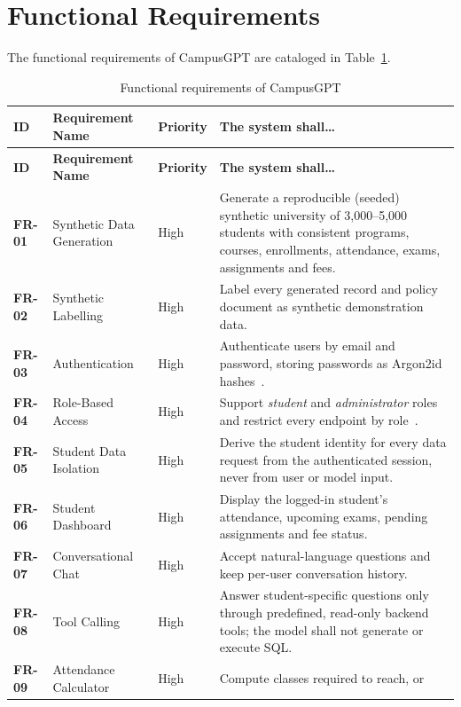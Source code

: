 \documentclass[11pt,a4paper,oneside]{report}
\begin{document}
\section{Functional Requirements}
The functional requirements of CampusGPT are cataloged in Table~\ref{tab:fr}.

\begin{longtable}{@{}>{\raggedright\arraybackslash}p{1.5cm}>{\raggedright\arraybackslash}p{3.4cm}>{\raggedright\arraybackslash}p{1.7cm}>{\raggedright\arraybackslash}p{7.4cm}@{}}
\caption{Functional requirements of CampusGPT}\label{tab:fr}\\
\toprule
\textbf{ID} & \textbf{Requirement Name} & \textbf{Priority} & \textbf{The system shall\ldots}\\
\midrule
\endfirsthead
\toprule
\textbf{ID} & \textbf{Requirement Name} & \textbf{Priority} & \textbf{The system shall\ldots}\\
\midrule
\endhead
\bottomrule
\endfoot
\textbf{FR-01} & Synthetic Data Generation & High & Generate a reproducible (seeded) synthetic
university of 3,000--5,000 students with consistent programs, courses, enrollments,
attendance, exams, assignments and fees.\\
\textbf{FR-02} & Synthetic Labelling & High & Label every generated record and policy
document as synthetic demonstration data.\\
\textbf{FR-03} & Authentication & High & Authenticate users by email and password, storing
passwords as Argon2id hashes~\cite{biryukov2016argon2}.\\
\textbf{FR-04} & Role-Based Access & High & Support \emph{student} and \emph{administrator}
roles and restrict every endpoint by role~\cite{sandhu1996rbac}.\\
\textbf{FR-05} & Student Data Isolation & High & Derive the student identity for every data
request from the authenticated session, never from user or model input.\\
\textbf{FR-06} & Student Dashboard & High & Display the logged-in student's attendance,
upcoming exams, pending assignments and fee status.\\
\textbf{FR-07} & Conversational Chat & High & Accept natural-language questions and keep
per-user conversation history.\\
\textbf{FR-08} & Tool Calling & High & Answer student-specific questions only through
predefined, read-only backend tools; the model shall not generate or execute SQL.\\
\textbf{FR-09} & Attendance Calculator & High & Compute classes required to reach, or

\end{longtable}
\end{document}
